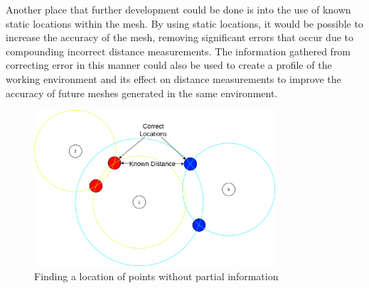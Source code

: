 Another place that further development could be done is into the use of known static locations within the mesh. By using static locations, it would be possible to increase the accuracy of the mesh, removing significant errors that occur due to compounding incorrect distance measurements. The information gathered from correcting error in this manner could also be used to create a profile of the working environment and its effect on distance measurements to improve the accuracy of future meshes generated in the same environment.


\begin{figure}[H]
	\centering
	\noindent\includegraphics[width=0.8\textwidth]{images/unknown_point_finding.png}
	\caption{Finding a location of points without partial information}
	\label{fig:partial_point_find}
\end{figure}

 